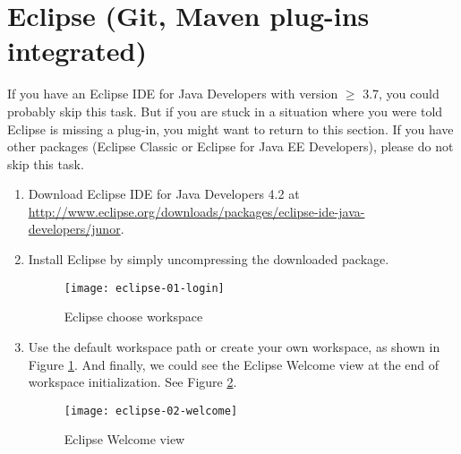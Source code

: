
\section{Eclipse (Git, Maven plug-ins integrated)}

If you have an Eclipse IDE for Java Developers with version $\ge$ 3.7, you could probably skip this task. But if you are stuck in a situation where you were told Eclipse is missing a plug-in, you might want to return to this section. If you have other packages (Eclipse Classic or Eclipse for Java EE Developers), please do not skip this task.

\begin{enumerate}
\item Download Eclipse IDE for Java Developers 4.2 at \url{http://www.eclipse.org/downloads/packages/eclipse-ide-java-developers/junor}.


\item Install Eclipse by simply uncompressing the downloaded package.

\begin{figure}[t]
\centering
\texttt{[image: eclipse-01-login]}
\caption{Eclipse choose workspace\label{eclipse-01-login}}
\end{figure}

\item Use the default workspace path or create your own workspace, as shown in Figure \ref{eclipse-01-login}. And finally, we could see the Eclipse Welcome view at the end of workspace initialization. See Figure \ref{eclipse-02-welcome}.

\begin{figure}[t]
\centering
\texttt{[image: eclipse-02-welcome]}
\caption{Eclipse Welcome view\label{eclipse-02-welcome}}
\end{figure}

\end{enumerate}
